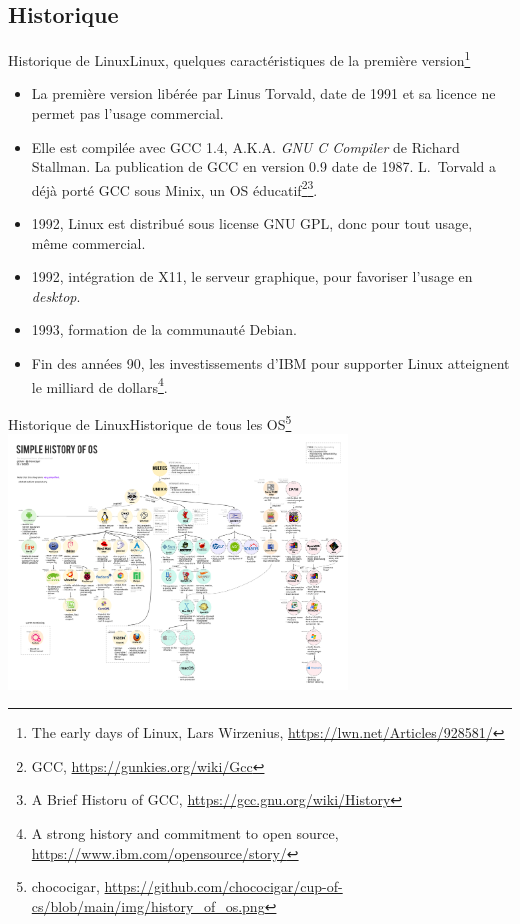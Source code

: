 \documentclass{beamer}
\begin{document}
    \subsection{Historique}\label{subsec:historique}

    \begin{frame}{Historique de Linux}{Linux, quelques caractéristiques de la première version\footnote{The early days of Linux, Lars Wirzenius, \url{https://lwn.net/Articles/928581/}}}
        \begin{footnotesize}
            \begin{itemize}
                \item La première version libérée par Linus Torvald, date de 1991 et sa licence ne permet pas l'usage commercial.
                \item Elle est compilée avec GCC 1.4, A.K.A. \textit{GNU C Compiler} de Richard Stallman.
                La publication de GCC en version 0.9 date de 1987.
                L.~Torvald a déjà porté GCC sous Minix, un OS éducatif\footnote{GCC, \url{https://gunkies.org/wiki/Gcc}}\footnotestep\footnote{A Brief Historu of GCC, \url{https://gcc.gnu.org/wiki/History}}.
                \item 1992, Linux est distribué sous license GNU GPL, donc pour tout usage, même commercial.
                \item 1992, intégration de X11, le serveur graphique, pour favoriser l'usage en \textit{desktop}.
                \item 1993, formation de la communauté Debian.
                \item Fin des années 90, les investissements d'IBM pour supporter Linux atteignent le milliard de dollars\footnote{A strong history and commitment to open source, \url{https://www.ibm.com/opensource/story/}}.
            \end{itemize}
        \end{footnotesize}
    \end{frame}

    \begin{frame}{Historique de Linux}{Historique de tous les OS\footnote{chococigar, \url{https://github.com/chococigar/cup-of-cs/blob/main/img/history\_of\_os.png}}}
        \centering
        \includegraphics[width=9cm]{image/history_of_os}
    \end{frame}
\end{document}
